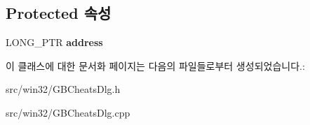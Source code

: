 \subsection*{Protected 속성}
\begin{DoxyCompactItemize}
\item 
\mbox{\label{class_add_g_b_cheat_adb910488c84e165b4fd33646b932ee2e}} 
L\+O\+N\+G\+\_\+\+P\+TR {\bfseries address}
\end{DoxyCompactItemize}


이 클래스에 대한 문서화 페이지는 다음의 파일들로부터 생성되었습니다.\+:\begin{DoxyCompactItemize}
\item 
src/win32/G\+B\+Cheats\+Dlg.\+h\item 
src/win32/G\+B\+Cheats\+Dlg.\+cpp\end{DoxyCompactItemize}
